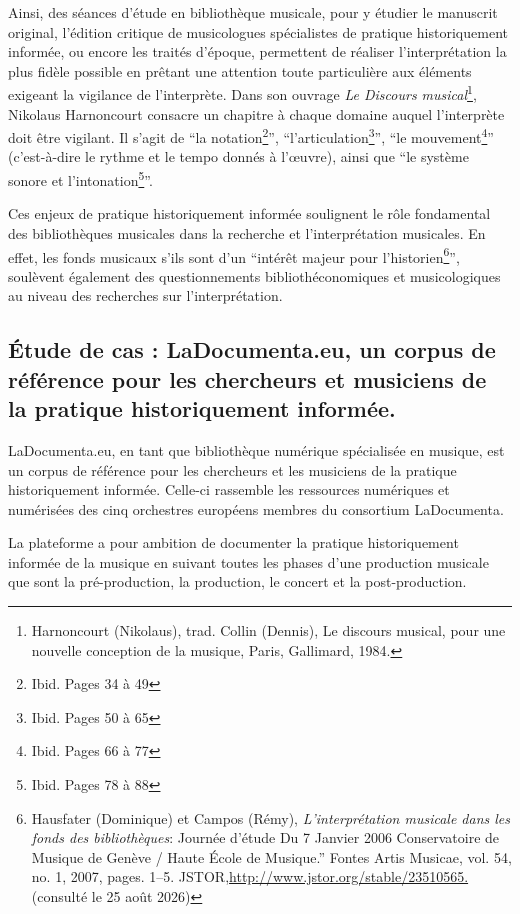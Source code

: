 Ainsi, des séances d'étude en bibliothèque musicale, pour y étudier le manuscrit original, l'édition critique de musicologues spécialistes de pratique historiquement informée, ou encore les traités d'époque, permettent de réaliser l'interprétation la plus fidèle possible en prêtant une attention toute particulière aux éléments exigeant la vigilance de l'interprète. 
Dans son ouvrage \textit{Le Discours musical}\footnote{Harnoncourt (Nikolaus), trad. Collin (Dennis), Le discours musical, pour une nouvelle conception de la musique, Paris, Gallimard, 1984.}, Nikolaus Harnoncourt consacre un chapitre à chaque domaine auquel l'interprète doit être vigilant. Il s'agit de  \enquote{la notation\footnote{Ibid. Pages 34 à 49}}, \enquote{l'articulation\footnote{Ibid. Pages 50 à 65}}, \enquote{le mouvement\footnote{Ibid. Pages 66 à 77}} (c'est-à-dire le rythme et le tempo donnés à l'œuvre), ainsi que \enquote{le système sonore et l'intonation\footnote{Ibid. Pages 78 à 88}}.  

Ces enjeux de pratique historiquement informée soulignent le rôle fondamental des bibliothèques musicales dans la recherche et l'interprétation musicales. En effet, les fonds musicaux s'ils sont d'un \enquote{intérêt majeur pour l'historien\footnote{Hausfater (Dominique) et Campos (Rémy), \textit{L’interprétation musicale dans les fonds des bibliothèques}: Journée d’étude Du 7 Janvier 2006 Conservatoire de Musique de Genève / Haute École de Musique.” Fontes Artis Musicae, vol. 54, no. 1, 2007, pages. 1–5. JSTOR,\url{http://www.jstor.org/stable/23510565.} (consulté le 25 août 2026)}}, soulèvent également des questionnements bibliothéconomiques et musicologiques au niveau des recherches sur l'interprétation.





\subsection*{Étude de cas : LaDocumenta.eu, un corpus de référence pour les chercheurs et musiciens de la pratique historiquement informée.}

LaDocumenta.eu, en tant que bibliothèque numérique spécialisée en musique, est un corpus de référence pour les chercheurs et les musiciens de la pratique historiquement informée. Celle-ci rassemble les ressources numériques et numérisées des cinq orchestres européens membres du consortium LaDocumenta.

La plateforme a pour ambition de documenter la pratique historiquement informée de la musique en suivant toutes les phases d'une production musicale que sont la pré-production, la production, le concert et la post-production.

